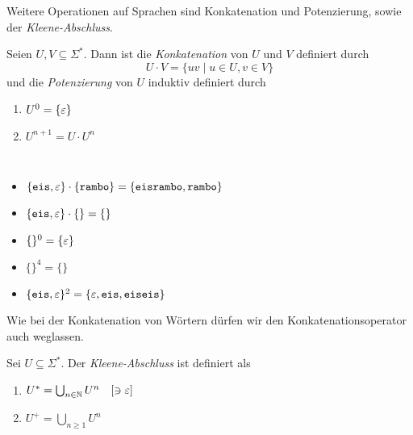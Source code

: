 Weitere Operationen auf Sprachen sind Konkatenation und Potenzierung, sowie der \emph{Kleene-Abschluss}.
\begin{Def} %
	Seien $U,V\subseteq \Sigma^*$. Dann ist die \emph{Konkatenation} von $U$ und $V$ definiert durch
	\[ U\cdot V = \{uv \mid u\in U, v\in V \} \]
  und die \emph{Potenzierung} von $U$ induktiv definiert durch
  \begin{enumerate}
  \item $U^0 = \{\varepsilon\}$
  \item $U^{n+1} = U \cdot U^{n}$
  \qedhere
  \end{enumerate}
\end{Def}
\begin{Bsp*}~
  \begin{itemize}
  \item $\{\mathtt{eis}, \varepsilon\} \cdot \{\mathtt{rambo}\} = \{\mathtt{eisrambo}, \mathtt{rambo}\}$
  \item $\{\mathtt{eis}, \varepsilon\} \cdot \{\} = \{\}$
  \item $\{\}^0 = \{\varepsilon\}$
  \item $\{\}^4 = \{\}$
  \item $\{\mathtt{eis}, \varepsilon\}^2 = \{\varepsilon, \mathtt{eis}, \mathtt{eiseis}\}$
  \qedhere
  \end{itemize}
\end{Bsp*}
Wie bei der Konkatenation von Wörtern dürfen wir den Konkatenationsoperator auch weglassen.
%
\begin{Def}
	Sei $U\subseteq\Sigma^*$.
  Der \emph{Kleene-Abschluss} ist definiert als
  \begin{enumerate}
  \item 
    $U^* = \bigcup_{n\in\mathbb{N}} U^n \quad [\ni\varepsilon]$
  \item
		$U^+ = \bigcup_{n\ge1} U^n$
  \qedhere
  \end{enumerate}
\end{Def}

